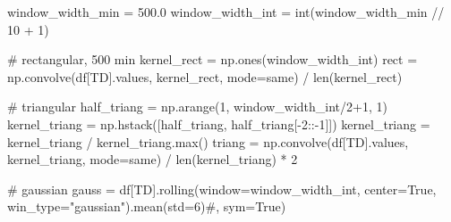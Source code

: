 \documentclass[
  letterpaper,
  DIV=11,
  numbers=noendperiod,
  oneside]{scrreprt}
\newenvironment{Shaded}{\begin{snugshade}}{\end{snugshade}}
\newcommand{\BuiltInTok}[1]{\textcolor[rgb]{0.00,0.23,0.31}{#1}}
\newcommand{\CommentTok}[1]{\textcolor[rgb]{0.37,0.37,0.37}{#1}}
\newcommand{\DecValTok}[1]{\textcolor[rgb]{0.68,0.00,0.00}{#1}}
\newcommand{\FloatTok}[1]{\textcolor[rgb]{0.68,0.00,0.00}{#1}}
\newcommand{\NormalTok}[1]{\textcolor[rgb]{0.00,0.23,0.31}{#1}}
\newcommand{\OperatorTok}[1]{\textcolor[rgb]{0.37,0.37,0.37}{#1}}
\newcommand{\StringTok}[1]{\textcolor[rgb]{0.13,0.47,0.30}{#1}}
\newcommand{\VariableTok}[1]{\textcolor[rgb]{0.07,0.07,0.07}{#1}}
\begin{document}
\begin{Shaded}
\begin{Highlighting}[]
\NormalTok{window\_width\_min }\OperatorTok{=} \FloatTok{500.0}
\NormalTok{window\_width\_int }\OperatorTok{=} \BuiltInTok{int}\NormalTok{(window\_width\_min }\OperatorTok{//} \DecValTok{10} \OperatorTok{+} \DecValTok{1}\NormalTok{)}

\CommentTok{\# rectangular, 500 min}
\NormalTok{kernel\_rect }\OperatorTok{=}\NormalTok{ np.ones(window\_width\_int)}
\NormalTok{rect }\OperatorTok{=}\NormalTok{ np.convolve(df[}\StringTok{\textquotesingle{}TD\textquotesingle{}}\NormalTok{].values, kernel\_rect, mode}\OperatorTok{=}\StringTok{\textquotesingle{}same\textquotesingle{}}\NormalTok{) }\OperatorTok{/} \BuiltInTok{len}\NormalTok{(kernel\_rect)}

\CommentTok{\# triangular}
\NormalTok{half\_triang }\OperatorTok{=}\NormalTok{ np.arange(}\DecValTok{1}\NormalTok{, window\_width\_int}\OperatorTok{/}\DecValTok{2}\OperatorTok{+}\DecValTok{1}\NormalTok{, }\DecValTok{1}\NormalTok{)}
\NormalTok{kernel\_triang }\OperatorTok{=}\NormalTok{ np.hstack([half\_triang, half\_triang[}\OperatorTok{{-}}\DecValTok{2}\NormalTok{::}\OperatorTok{{-}}\DecValTok{1}\NormalTok{]])}
\NormalTok{kernel\_triang }\OperatorTok{=}\NormalTok{ kernel\_triang }\OperatorTok{/}\NormalTok{ kernel\_triang.}\BuiltInTok{max}\NormalTok{()}
\NormalTok{triang }\OperatorTok{=}\NormalTok{ np.convolve(df[}\StringTok{\textquotesingle{}TD\textquotesingle{}}\NormalTok{].values, kernel\_triang, mode}\OperatorTok{=}\StringTok{\textquotesingle{}same\textquotesingle{}}\NormalTok{) }\OperatorTok{/} \BuiltInTok{len}\NormalTok{(kernel\_triang) }\OperatorTok{*} \DecValTok{2}

\CommentTok{\# gaussian}
\NormalTok{gauss }\OperatorTok{=}\NormalTok{ df[}\StringTok{\textquotesingle{}TD\textquotesingle{}}\NormalTok{].rolling(window}\OperatorTok{=}\NormalTok{window\_width\_int, center}\OperatorTok{=}\VariableTok{True}\NormalTok{, win\_type}\OperatorTok{=}\StringTok{"gaussian"}\NormalTok{).mean(std}\OperatorTok{=}\DecValTok{6}\NormalTok{)}\CommentTok{\#, sym=True)}
\end{Highlighting}
\end{Shaded}
\end{document}
